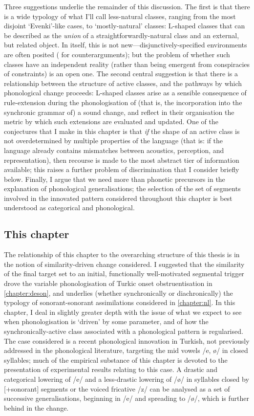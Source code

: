 Three suggestions underlie the remainder of this discussion. The first is that there is a wide typology of what I'll call less-natural classes, ranging from the most disjoint `Evenki'-like cases, to `mostly-natural' classes: L-shaped classes that can be described as the \emph{union} of a straightforwardly-natural class and an external, but related object. In itself, this is not new---disjunctively-specified environments are often posited (\citealt{Flemming2005} for counterarguments); but the problem of whether such classes have an independent reality (rather than being emergent from conspiracies of constraints) is an open one. The second central suggestion is that there is a relationship between the structure of active classes, and the pathways by which phonological change proceeds: L-shaped classes arise as a sensible consequence of rule-extension during the phonologisation of (that is, the incorporation into the synchronic grammar of) a sound change, and reflect in their organisation the metric by which such extensions are evaluated and updated. One of the conjectures that I make in this chapter is that \emph{if} the shape of an active class is not overdetermined by multiple properties of the language (that is: if the language already contains mismatches between acoustics, perception, and representation), then recourse is made to the most abstract tier of information available; this raises a further problem of discrimination that I consider briefly below. Finally, I argue that we need more than phonetic precursors in the explanation of phonological generalisations; the selection of the set of segments involved in the innovated pattern considered throughout this chapter is best understood as categorical and phonological.

\subsection{This chapter}

The relationship of this chapter to the overarching structure of this thesis is in the notion of similarity-driven change considered. I suggested that the similarity of the final target set to an initial, functionally well-motivated segmental trigger drove the variable phonologisation of Turkic onset obstruentisation in \cref{chapter:deson}, and underlies (whether synchronically or diachronically) the typology of sonorant-sonorant assimilations considered in \cref{chapter:nl}. In this chapter, I deal in slightly greater depth with the issue of what we expect to see when phonologisation is `driven' by some parameter, and of how the synchronically-active class associated with a phonological pattern is regularised. The case considered is a recent phonological innovation in Turkish, not previously addressed in the phonological literature, targeting the mid vowels /e, ø/ in closed syllables; much of the empirical substance of this chapter is devoted to the presentation of experimental results relating to this case.  A drastic and categorical lowering of /e/ and a less-drastic lowering of /\o/ in syllables closed by [+sonorant] segments or the voiced fricative /z/ can be analysed as a set of successive generalisations, beginning in /e/ and spreading to /\o/, which is further behind in the change.


